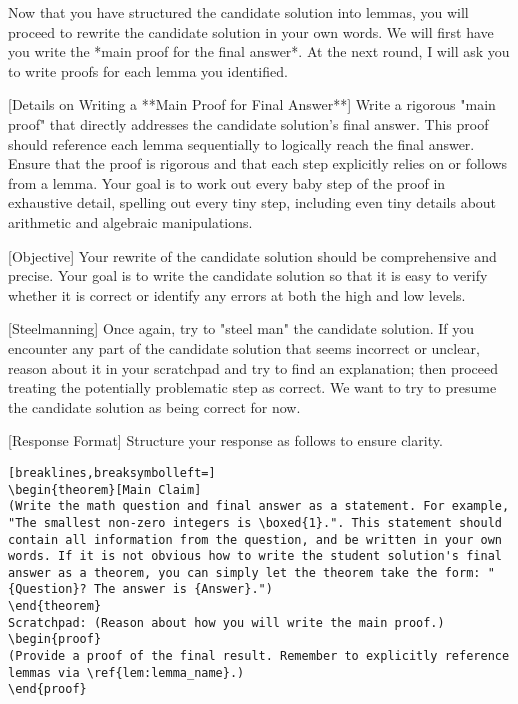 \begin{tcolorbox}[breakable,title=Verification Prompt 2]
Now that you have structured the candidate solution into lemmas, you will proceed to rewrite the candidate solution in your own words. We will first have you write the *main proof for the final answer*. At the next round, I will ask you to write proofs for each lemma you identified.

[Details on Writing a **Main Proof for Final Answer**]
Write a rigorous "main proof" that directly addresses the candidate solution's final answer. This proof should reference each lemma sequentially to logically reach the final answer. Ensure that the proof is rigorous and that each step explicitly relies on or follows from a lemma. Your goal is to work out every baby step of the proof in exhaustive detail, spelling out every tiny step, including even tiny details about arithmetic and algebraic manipulations.

[Objective] 
Your rewrite of the candidate solution should be comprehensive and precise. Your goal is to write the candidate solution so that it is easy to verify whether it is correct or identify any errors at both the high and low levels.

[Steelmanning] 
Once again, try to "steel man" the candidate solution. If you encounter any part of the candidate solution that seems incorrect or unclear, reason about it in your scratchpad and try to find an explanation; then proceed treating the potentially problematic step as correct. We want to try to presume the candidate solution as being correct for now.

[Response Format] 
Structure your response as follows to ensure clarity.
\begin{Verbatim}[breaklines,breaksymbolleft=]
\begin{theorem}[Main Claim]
(Write the math question and final answer as a statement. For example, "The smallest non-zero integers is \boxed{1}.". This statement should contain all information from the question, and be written in your own words. If it is not obvious how to write the student solution's final answer as a theorem, you can simply let the theorem take the form: "{Question}? The answer is {Answer}.")
\end{theorem}
Scratchpad: (Reason about how you will write the main proof.)
\begin{proof}
(Provide a proof of the final result. Remember to explicitly reference lemmas via \ref{lem:lemma_name}.)
\end{proof}
\end{Verbatim}
\end{tcolorbox}

